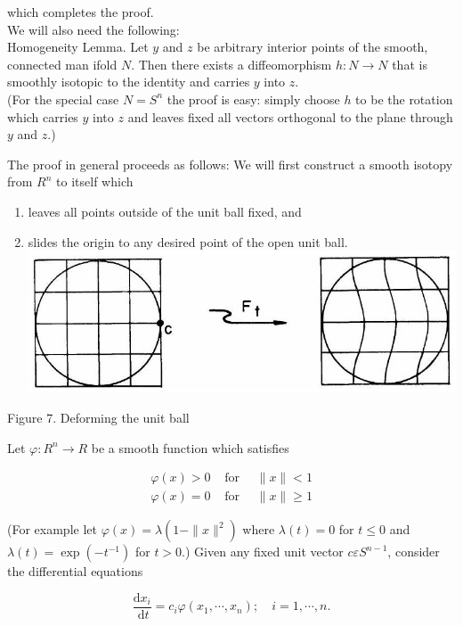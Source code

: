 \documentclass[10pt, letterpaper]{article}
\begin{document}
which completes the proof.\\
We will also need the following:\\
Homogeneity Lemma. Let $y$ and $z$ be arbitrary interior points of the smooth, connected man ifold $N$. Then there exists a diffeomorphism $h: N \rightarrow N$ that is smoothly isotopic to the identity and carries $y$ into $z$.\\
(For the special case $N=S^{n}$ the proof is easy: simply choose $h$ to be the rotation which carries $y$ into $z$ and leaves fixed all vectors orthogonal to the plane through $y$ and $z$.)

The proof in general proceeds as follows: We will first construct a smooth isotopy from $R^{n}$ to itself which

\begin{enumerate}
  \item leaves all points outside of the unit ball fixed, and
  \item slides the origin to any desired point of the open unit ball.\\
\includegraphics[scale=0.2, center]{2025_05_28_7c9927389b272ddbc2c3g-34}
\end{enumerate}

Figure 7. Deforming the unit ball

Let $\varphi: R^{n} \rightarrow R$ be a smooth function which satisfies

$$
\begin{array}{ll}
\varphi(x)>0 & \text { for } \quad\|x\|<1 \\
\varphi(x)=0 & \text { for } \quad\|x\| \geq 1
\end{array}
$$

(For example let $\varphi(x)=\lambda\left(1-\|x\|^{2}\right)$ where $\lambda(t)=0$ for $t \leq 0$ and $\lambda(t)=\exp \left(-t^{-1}\right)$ for $t>0$.) Given any fixed unit vector $c \varepsilon S^{n-1}$, consider the differential equations

$$
\frac{\mathrm{d} x_{i}}{\mathrm{~d} t}=c_{i} \varphi\left(x_{1}, \cdots, x_{n}\right) ; \quad i=1, \cdots, n .
$$
\end{document}
